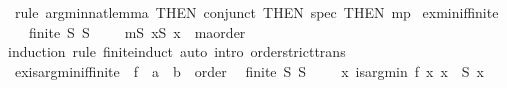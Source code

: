 \begin{isabellebody}
\isadelimproof
%
\endisadelimproof
%
\isatagproof
{}\isamarkupfalse%
\ {\isacharparenleft}{\kern0pt}rule\ arg{\isacharunderscore}{\kern0pt}min{\isacharunderscore}{\kern0pt}nat{\isacharunderscore}{\kern0pt}lemma\ {\isacharbrackleft}{\kern0pt}THEN\ conjunct{}{\isacharcomma}{\kern0pt}\ THEN\ spec{\isacharcomma}{\kern0pt}\ THEN\ mp{\isacharbrackright}{\kern0pt}{\isacharparenright}{\kern0pt}%
\endisatagproof
{\isafoldproof}%
%
\isadelimproof
\isanewline
%
\endisadelimproof
\isanewline
{}\isamarkupfalse%
\ ex{\isacharunderscore}{\kern0pt}min{\isacharunderscore}{\kern0pt}if{\isacharunderscore}{\kern0pt}finite{\isacharcolon}{\kern0pt}\isanewline
\ \ {\isachardoublequoteopen}{\isasymlbrakk}\ finite\ S{\isacharsemicolon}{\kern0pt}\ S\ {\isasymnoteq}\ {\isacharbraceleft}{\kern0pt}{\isacharbraceright}{\kern0pt}\ {\isasymrbrakk}\ {\isasymLongrightarrow}\ {\isasymexists}m{\isasymin}S{\isachardot}{\kern0pt}\ {\isasymnot}{\isacharparenleft}{\kern0pt}{\isasymexists}x{\isasymin}S{\isachardot}{\kern0pt}\ x\ {\isacharless}{\kern0pt}\ {\isacharparenleft}{\kern0pt}m{\isacharcolon}{\kern0pt}{\isacharcolon}{\kern0pt}{\isacharprime}{\kern0pt}a{\isacharcolon}{\kern0pt}{\isacharcolon}{\kern0pt}order{\isacharparenright}{\kern0pt}{\isacharparenright}{\kern0pt}{\isachardoublequoteclose}\isanewline
%
\isadelimproof
%
\endisadelimproof
%
\isatagproof
{}\isamarkupfalse%
{\isacharparenleft}{\kern0pt}induction\ rule{\isacharcolon}{\kern0pt}\ finite{\isachardot}{\kern0pt}induct{\isacharparenright}{\kern0pt}\ {\isacharparenleft}{\kern0pt}auto\ intro{\isacharcolon}{\kern0pt}\ order{\isachardot}{\kern0pt}strict{\isacharunderscore}{\kern0pt}trans{\isacharparenright}{\kern0pt}%
\endisatagproof
{\isafoldproof}%
%
\isadelimproof
\isanewline
%
\endisadelimproof
\isanewline
{}\isamarkupfalse%
\ ex{\isacharunderscore}{\kern0pt}is{\isacharunderscore}{\kern0pt}arg{\isacharunderscore}{\kern0pt}min{\isacharunderscore}{\kern0pt}if{\isacharunderscore}{\kern0pt}finite{\isacharcolon}{\kern0pt}\ \ f\ {\isacharcolon}{\kern0pt}{\isacharcolon}{\kern0pt}\ {\isachardoublequoteopen}{\isacharprime}{\kern0pt}a\ {\isasymRightarrow}\ {\isacharprime}{\kern0pt}b\ {\isacharcolon}{\kern0pt}{\isacharcolon}{\kern0pt}\ order{\isachardoublequoteclose}\isanewline
{}\ {\isachardoublequoteopen}{\isasymlbrakk}\ finite\ S{\isacharsemicolon}{\kern0pt}\ S\ {\isasymnoteq}\ {\isacharbraceleft}{\kern0pt}{\isacharbraceright}{\kern0pt}\ {\isasymrbrakk}\ {\isasymLongrightarrow}\ {\isasymexists}x{\isachardot}{\kern0pt}\ is{\isacharunderscore}{\kern0pt}arg{\isacharunderscore}{\kern0pt}min\ f\ {\isacharparenleft}{\kern0pt}{\isasymlambda}x{\isachardot}{\kern0pt}\ x\ {\isasymin}\ S{\isacharparenright}{\kern0pt}\ x{\isachardoublequoteclose}\isanewline

\end{isabellebody}
